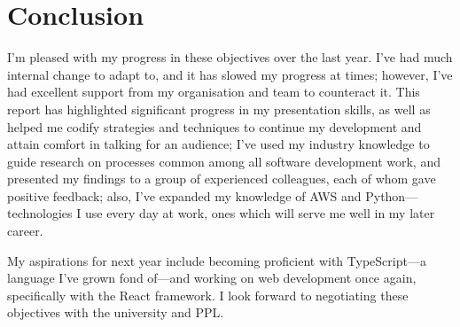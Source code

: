 \section{Conclusion}
I'm pleased with my progress in these objectives over the last year. I've had much internal change to adapt to, and it has slowed my progress at times; however, I've had excellent support from my organisation and team to counteract it. This report has highlighted significant progress in my presentation skills, as well as helped me codify strategies and techniques to continue my development and attain comfort in talking for an audience; I've used my industry knowledge to guide research on processes common among all software development work, and presented my findings to a group of experienced colleagues, each of whom gave positive feedback; also, I've expanded my knowledge of AWS and Python---technologies I use every day at work, ones which will serve me well in my later career.

My aspirations for next year include becoming proficient with TypeScript---a language I've grown fond of---and working on web development once again, specifically with the React framework. I look forward to negotiating these objectives with the university and PPL.